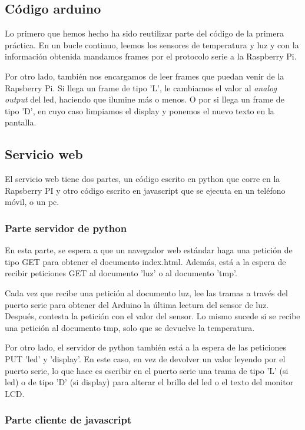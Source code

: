 \documentclass[]{article}
\begin{document}
\subsection{Código arduino}

Lo primero que hemos hecho ha sido reutilizar parte del código de la primera práctica. En un bucle continuo, leemos los sensores de temperatura y luz y con la información obtenida mandamos frames por el protocolo serie a la Raspberry Pi.

\hfill

Por otro lado, también nos encargamos de leer frames que puedan venir de la Rapsberry Pi. Si llega un frame de tipo 'L', le cambiamos el valor al \textit{analog output} del led, haciendo que ilumine más o menos. O por si llega un frame de tipo 'D', en cuyo caso limpiamos el display y ponemos el nuevo texto en la pantalla.

\subsection{Servicio web}
El servicio web tiene dos partes, un código escrito en python que corre en la Rapsberry PI y otro código escrito en javascript que se ejecuta en un teléfono móvil, o un pc.

\subsubsection{Parte servidor de python}
En esta parte, se espera a que un navegador web estándar haga una petición de tipo GET para obtener el documento index.html. Además, está a la espera de recibir peticiones GET al documento 'luz' o al documento 'tmp'.

\hfill

Cada vez que recibe una petición al documento luz, lee las tramas a través del puerto serie para obtener del Arduino la última lectura del sensor de luz. Después, contesta la petición con el valor del sensor. Lo mismo sucede si se recibe una petición al documento tmp, solo que se devuelve la temperatura.

\hfill

Por otro lado, el servidor de python también está a la espera de las peticiones PUT 'led' y 'display'. En este caso, en vez de devolver un valor leyendo por el puerto serie, lo que hace es escribir en el puerto serie una trama de tipo 'L' (si led) o de tipo 'D' (si display) para alterar el brillo del led o el texto del monitor LCD.

\subsubsection{Parte cliente de javascript}
\end{document}
